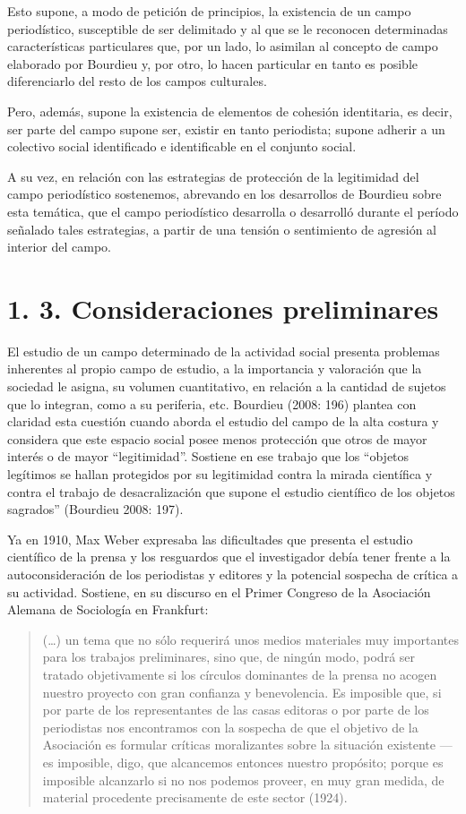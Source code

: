 Esto supone, a modo de petición de principios, la existencia de un campo periodístico, susceptible de ser delimitado y al que se le reconocen determinadas características particulares que, por un lado, lo asimilan al concepto de campo elaborado por Bourdieu y, por otro, lo hacen particular en tanto es posible diferenciarlo del resto de los campos culturales.

Pero, además, supone la existencia de elementos de cohesión identitaria, es decir, ser parte del campo supone ser, existir en tanto periodista; supone adherir a un colectivo social identificado e identificable en el conjunto social.

A su vez, en relación con las estrategias de protección de la legitimidad del campo periodístico sostenemos, abrevando en los desarrollos de Bourdieu sobre esta temática, que el campo periodístico desarrolla o desarrolló durante el período señalado tales estrategias, a partir de una tensión o sentimiento de agresión al interior del campo.

\section{1. 3. Consideraciones preliminares}

El estudio de un campo determinado de la actividad social presenta problemas inherentes al propio campo de estudio, a la importancia y valoración que la sociedad le asigna, su volumen cuantitativo, en relación a la cantidad de sujetos que lo integran, como a su periferia, etc. Bourdieu (2008: 196) plantea con claridad esta cuestión cuando aborda el estudio del campo de la alta costura y considera que este espacio social posee menos protección que otros de mayor interés o de mayor \enquote{legitimidad}. Sostiene en ese trabajo que los \enquote{objetos legítimos se hallan protegidos por su legitimidad contra la mirada científica y contra el trabajo de desacralización que supone el estudio científico de los objetos sagrados} (Bourdieu 2008: 197).

Ya en 1910, Max Weber expresaba las dificultades que presenta el estudio científico de la prensa y los resguardos que el investigador debía tener frente a la autoconsideración de los periodistas y editores y la potencial sospecha de crítica a su actividad. Sostiene, en su discurso en el Primer Congreso de la Asociación Alemana de Sociología en Frankfurt:

\begin{quote}
(\ldots) un tema que no sólo requerirá unos medios materiales muy importantes para los trabajos preliminares, sino que, de ningún modo, podrá ser tratado objetivamente si los círculos dominantes de la prensa no acogen nuestro proyecto con gran confianza y benevolencia. Es imposible que, si por parte de los representantes de las casas editoras o por parte de los periodistas nos encontramos con la sospecha de que el objetivo de la Asociación es formular críticas moralizantes sobre la situación existente ---es imposible, digo, que alcancemos entonces nuestro propósito; porque es imposible alcanzarlo si no nos podemos proveer, en muy gran medida, de material procedente precisamente de este sector (1924).
\end{quote}

